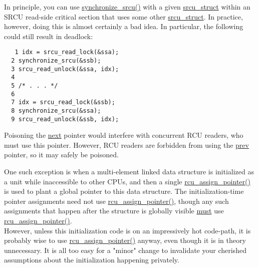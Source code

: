 In principle, you can use
\url{synchronize_srcu()} with a given \url{srcu_struct}
within an SRCU read-side critical section that uses some other
\url{srcu_struct}.
In practice, however, doing this is almost certainly a bad idea.
In particular, the following could still result in deadlock:
\\
\vspace{5pt}
\begin{minipage}[t]{\columnwidth}
{\tt
~~1 idx = srcu\_read\_lock(\&ssa);\\
~~2 synchronize\_srcu(\&ssb);\\
~~3 srcu\_read\_unlock(\&ssa, idx);\\
~~4 \\
~~5 /* . . . */\\
~~6 \\
~~7 idx = srcu\_read\_lock(\&ssb);\\
~~8 synchronize\_srcu(\&ssa);\\
~~9 srcu\_read\_unlock(\&ssb, idx);\\
}
\end{minipage}



Poisoning the \url{next} pointer would interfere
with concurrent RCU readers, who must use this pointer.
However, RCU readers are forbidden from using the \url{prev}
pointer, so it may safely be poisoned.


One such exception is when a multi-element linked
data structure is initialized as a unit while inaccessible to other
CPUs, and then a single \url{rcu_assign_pointer()} is used
to plant a global pointer to this data structure.
The initialization-time pointer assignments need not use
\url{rcu_assign_pointer()}, though any such assignments that
happen after the structure is globally visible \url{must} use
\url{rcu_assign_pointer()}.
\\
However, unless this initialization code is on an impressively hot
code-path, it is probably wise to use \url{rcu_assign_pointer()}
anyway, even though it is in theory unnecessary.
It is all too easy for a "minor" change to invalidate your cherished
assumptions about the initialization happening privately.


